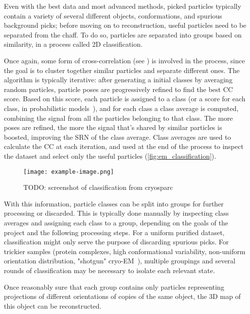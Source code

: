 Even with the best data and most advanced methods, picked particles typically contain a variety of several different objects, conformations, and spurious background picks; before moving on to reconstruction, useful particles need to be separated from the chaff.
To do so, particles are separated into groups based on similarity, in a process called 2D classification.

Once again, some form of cross-correlation (see ) is involved in the process, since the goal is to cluster together similar particles and separate different ones.
The algorithm is typically iterative: after generating a initial classes by averaging random particles, particle poses are progressively refined to find the best CC score.
Based on this score, each particle is assigned to a class (or a score for each class, in probabilistic models~\cite{scheresRELIONImplementationBayesian2012}), and for each class a class average is computed, combining the signal from all the particles belonging to that class. The more poses are refined, the more the signal that's shared by similar particles is boosted, improving the SRN of the class average.
Class averages are used to calculate the CC at each iteration, and used at the end of the process to inspect the dataset and select only the useful particles (\autoref{fig:em_classification}).

\begin{figure}[ht]
    \centering
    \texttt{[image: example-image.png]}
    \caption{TODO: screenshot of classification from cryosparc}
    \label{fig:em_classification}
\end{figure}

With this information, particle classes can be split into groups for further processing or discarded.
This is typically done manually by inspecting class averages and assigning each class to a group, depending on the goals of the project and the following processing steps.
For a uniform purified dataset, classification might only serve the purpose of discarding spurious picks.
For trickier samples (protein complexes, high conformational variability, non-uniform orientation distribution, "shotgun" cryo-EM~\cite{suBuildRetrieveMethodology2021,kyrilisIntegrativeBiologyNative2019}), multiple groupings and several rounds of classification may be necessary to isolate each relevant state.

Once reasonably sure that each group contains only particles representing projections of different orientations of copies of the same object, the 3D map of this object can be reconstructed.

